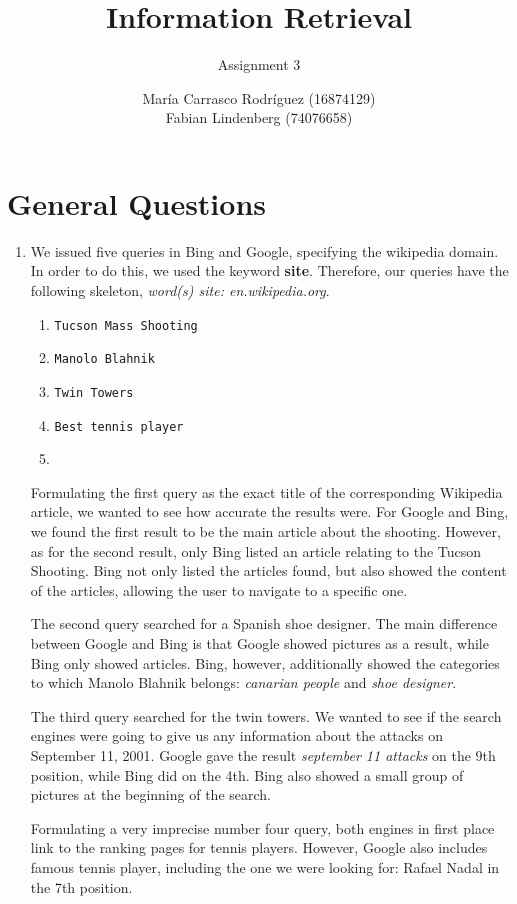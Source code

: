 \documentclass[a4paper,11pt,oneside]{book}
\title{Information Retrieval }
\subtitle{Assignment 3}
\author{ María Carrasco Rodríguez (16874129) \\
		Fabian Lindenberg (74076658)}
\begin{document}
\kostspieligmaketitle

\tableofcontents
\pagebreak

\chapter{General Questions}

\begin{enumerate}\item We issued five queries in Bing and Google, specifying the wikipedia domain. In order to do this, we used the keyword {\bf site}. Therefore, our queries have the following skeleton, {\it word(s) site: en.wikipedia.org}.
		\begin{enumerate}
			\renewcommand{\labelenumii}{\Roman{enumii}}
			\item \texttt{Tucson Mass Shooting}
			\item \texttt{Manolo Blahnik}
			\item \texttt{Twin Towers}
			\item \texttt{Best tennis player}
			\item \texttt{}
		\end{enumerate}
	Formulating the first query as the exact title of the corresponding Wikipedia article, we wanted to see how accurate the results were. For Google and Bing, we found the first result to be the main article about the shooting. However, as for the second result, only Bing listed an article relating to the Tucson Shooting. Bing not only listed the articles found, but also showed the content of the articles, allowing the user to navigate to a specific one.

	The second query searched for a Spanish shoe designer. The main difference between Google and Bing is that Google showed pictures as a result, while Bing only showed articles. Bing, however, additionally showed the categories to which Manolo Blahnik belongs: {\it canarian people} and {\it shoe designer}.

	The third query searched for the twin towers. We wanted to see if the search engines were going to give us any information about the attacks on September 11, 2001. Google gave the result {\it september 11 attacks} on the 9th position, while Bing did on the 4th. Bing also showed a small group of pictures at the beginning of the search.

	Formulating a very imprecise number four query, both engines in first place link to the ranking pages for tennis players. However, Google also includes famous tennis player, including the one we were looking for: Rafael Nadal in the 7th position.


\end{enumerate}
\end{document}
